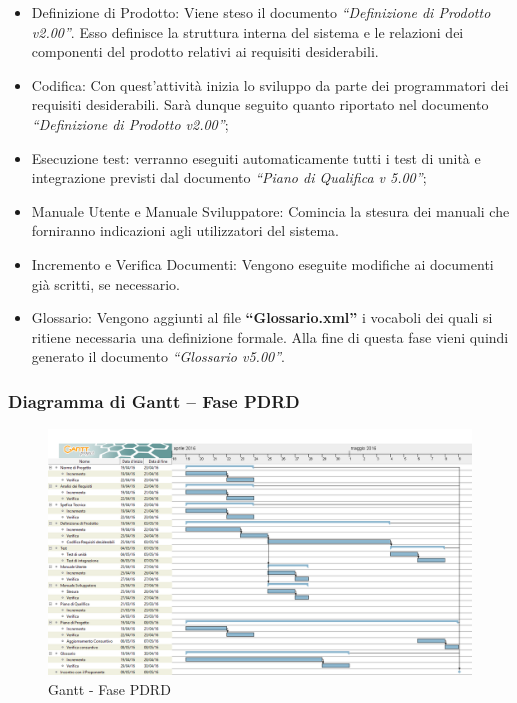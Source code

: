 \documentclass[../PianoProgetto.tex]{subfiles}
\begin{document}
		\begin{itemize}
			\item Definizione di Prodotto: Viene steso il documento \textit{“Definizione di Prodotto v2.00”}. Esso definisce la struttura interna del sistema e le relazioni dei componenti del prodotto relativi ai requisiti desiderabili.

			\item Codifica: Con quest’attività inizia lo sviluppo da parte dei programmatori dei requisiti desiderabili. Sarà dunque seguito quanto riportato nel documento \textit{“Definizione di Prodotto v2.00”};

	 		\item Esecuzione test: verranno eseguiti automaticamente tutti i test di unità e integrazione previsti dal documento \textit{“Piano di Qualifica v 5.00”};

			\item Manuale Utente e Manuale Sviluppatore: Comincia la stesura dei manuali che forniranno indicazioni agli utilizzatori del sistema.

			\item Incremento e Verifica Documenti: Vengono eseguite modifiche ai documenti già scritti, se necessario.

			\item Glossario: Vengono aggiunti al file \textbf{“Glossario.xml”} i vocaboli dei quali si ritiene necessaria una definizione formale. Alla fine di questa fase vieni quindi generato il documento \textit{“Glossario v5.00”}.
		\end{itemize}
		
		\subsubsection{Diagramma di Gantt – Fase PDRD}
			\begin{figure}[!h]
				\centering
				\includegraphics[width=\textwidth]{gantt_png/5-requisiti_desiderabili}
				\caption{Gantt - Fase PDRD}
				\label{fig:Gantt - Fase PDRD}
			\end{figure}
			
\end{document}

